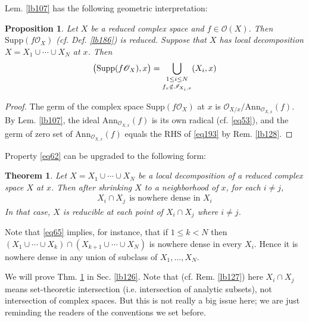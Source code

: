 \documentclass[12pt,b5paper,notitlepage]{report}
\theoremstyle{definition}
\theoremstyle{plain}
\newtheorem{thm}[df]{Theorem}
\newtheorem{pp}[df]{Proposition}
\newcommand{\scr}{\mathscr}
\newcommand{\Ann}{\mathrm{Ann}}
\newcommand{\Supp}{\mathrm{Supp}}
\numberwithin{equation}{section}
\begin{document}
Lem. \ref{lb107} has the following geometric interpretation:

\begin{pp}\label{lb378}
Let $X$ be a reduced complex space and $f\in\scr O(X)$. Then $\Supp(f\scr O_X)$ (cf. Def. \ref{lb186}) is reduced. Suppose that $X$ has local decomposition $X=X_1\cup\cdots\cup X_N$ at $x$. Then 
\begin{align}\label{eq193}
\big(\Supp(f\scr O_X),x\big)=\bigcup_{
\begin{subarray}{c}
1\leq i\leq N\\[0.3ex]
f_x\notin\scr I_{X_i,x}
\end{subarray}
} (X_i,x)
\end{align}
\end{pp}

\begin{proof}
The germ of the complex space $\Supp(f\scr O_X)$ at $x$ is $\scr O_{X/x}/\Ann_{\scr O_{X,x}}(f)$. By Lem. \ref{lb107}, the ideal $\Ann_{\scr O_{X,x}}(f)$ is its own radical (cf. \eqref{eq53}), and the germ of zero set of $\Ann_{\scr O_{X,x}}(f)$ equals the RHS of \eqref{eq193} by Rem. \ref{lb128}.
\end{proof}




Property \eqref{eq62} can be upgraded to the following form:

\begin{thm}\label{lb125}
Let $X=X_1\cup\cdots\cup X_N$ be a local decomposition of a reduced complex space $X$ at $x$. Then after shrinking $X$ to a neighborhood of $x$, for each $i\neq j$,
\begin{align}
X_i\cap X_j~~\text{is nowhere dense in }X_i\label{eq65}
\end{align}
In that case, $X$ is reducible at each point of $X_i\cap X_j$ where $i\neq j$.
\end{thm}

Note that \eqref{eq65} implies, for instance, that if $1\leq k<N$ then $(X_1\cup\cdots\cup X_k)\cap (X_{k+1}\cup\cdots\cup X_N)$ is nowhere dense in every $X_i$. Hence it is nowhere dense in any union of subclass of $X_1,\dots,X_N$.


We will prove Thm. \ref{lb125} in Sec. \ref{lb126}. Note that (cf. Rem. \ref{lb127}) here $X_i\cap X_j$ means set-theoretic intersection (i.e. intersection of analytic subsets), not intersection of complex spaces. But this is not really a big issue here; we are just reminding the readers of the conventions we set before.
\end{document}

